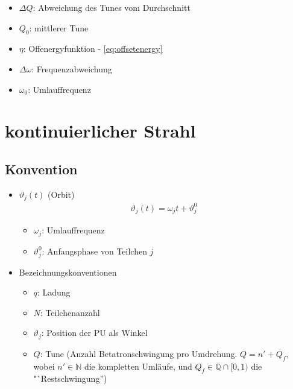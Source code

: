 \documentclass[12pt]{article}%
\renewcommand{\theta}{\vartheta}
\begin{document}
\begin{itemize}
	\begin{itemize}
	
		\item $\Delta Q$: Abweichung des Tunes vom Durchschnitt
		\item $Q_0$: mittlerer Tune
		\item $\eta$: Offenergyfunktion - \eqref{eq:offsetenergy}
		\item $\Delta \omega$: Frequenzabweichung
		\item $\omega_0$: Umlauffrequenz
	
	\end{itemize}

\end{itemize}

\section{kontinuierlicher Strahl}

\subsection{Konvention}

\begin{itemize}

\item $\theta_j(t)$ (Orbit)
\begin{align}
\label{eq:theta_j}\theta_j(t) = \omega_j t + \theta_j^0
\end{align}

	\begin{itemize}
	
	\item $\omega_j$: Umlauffrequenz
	\item $\theta_j^0$: Anfangsphase von Teilchen $j$
	
	\end{itemize}

\item Bezeichnungskonventionen

	\begin{itemize}
	
		\item $q$: Ladung
		\item $N$: Teilchenanzahl
		\item $\theta_j$: Position der PU als Winkel
		\item $Q$: Tune (Anzahl Betatronschwingung pro Umdrehung. $Q = n' + Q_f$, wobei $n' \in \mathbb{N}$ die kompletten Umläufe, und $Q_f \in \mathbb{Q} \cap [0,1)$ die "`Restschwingung'')
	\end{itemize}

\end{itemize}
\end{document}
